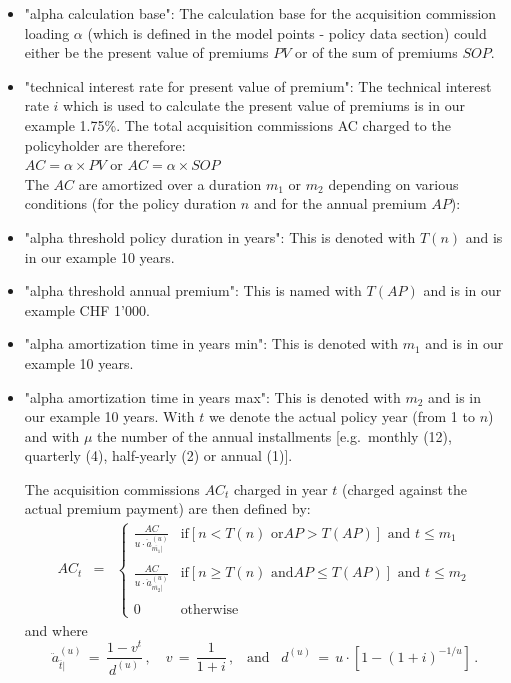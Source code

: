 \begin{itemize}
	\item "alpha calculation base": The calculation base for the acquisition commission loading $\alpha$ (which is defined in the model points - policy data section) could either be the present value of premiums $PV$ or of the sum of premiums $SOP$.
	\item "technical interest rate for present value of premium": The technical interest rate $i$ which is used to calculate the present value of premiums is in our example 1.75\%.
The total acquisition commissions AC charged to the policyholder are therefore: \\

$AC = \alpha \times PV$ or $AC = \alpha \times SOP$\\

The $AC$ are amortized over a duration $m_1$ or $m_2$ depending on various conditions (for the policy duration $n$ and for the annual premium $AP$):
	\item "alpha threshold policy duration in years": This is denoted with $T(n)$ and is in our example 10 years.
	\item "alpha threshold annual premium": This is named with $T(AP)$ and is in our example CHF 1'000.
	\item "alpha amortization time in years min": This is denoted with $m_1$ and is in our example 10 years.
	\item "alpha amortization time in years max": This is denoted with $m_2$ and is in our example 10 years.
With $t$ we denote the actual policy year (from 1 to $n$) and with $\mu$ the number of  the annual installments [e.g.~monthly (12), quarterly (4), half-yearly (2) or annual (1)].


The acquisition commissions $AC_t$ charged in year $t$ (charged against the actual
premium payment) are then defined by:
\begin{eqnarray*}
AC_t & = & \left\{\begin{array}{rl}
\displaystyle{\frac{AC}{u\cdot\ddot{a}^{(u)}_{\overline{m_1}\!|}} }& \mbox{if
}[n<T(n)\mbox{ or
}AP>T(AP)]\mbox{ and }t\leq m_1\\\\
\displaystyle{\frac{AC}{u\cdot\ddot{a}^{(u)}_{\overline{m_2}\!|}} }& \mbox{if
}[n\geq T(n)\mbox{ and
}AP\leq T(AP)]\mbox{ and }t\leq m_2\\\\
0 & \mbox{otherwise}
\end{array}\right.
\end{eqnarray*}
and where
\begin{equation*}
\ddot{a}^{(u)}_{\overline{t}\!|}\,=\,\frac{1-v^t}{d^{(u)}}\,,\quad
v\,=\,\frac{1}{1+i}\,,\,\,\,\mbox{ and }\,\,\,d^{(u)}\,=\,u\cdot[1-(1+i)^{-1/u}]\,.
\end{equation*}


\end{itemize}
